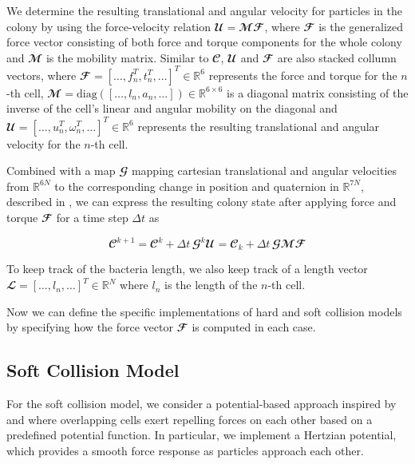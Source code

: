 \documentclass[conference]{IEEEtran}
\begin{document}
We determine the resulting translational and angular velocity for particles in the colony by using the force-velocity relation $\mathbfcal{U} = \mathbfcal{M} \mathbfcal{F}$, where $\mathbfcal{F}$ is the generalized force vector consisting of both force and torque components for the whole colony and $\mathbfcal{M}$ is the mobility matrix. Similar to $\mathbfcal{C}$, $\mathbfcal{U}$ and $\mathbfcal{F}$ are also stacked collumn vectors, where $\mathbfcal{F} = [\dots, f_n^T, t_n^T, \dots]^T \in \mathbb{R}^{6}$ represents the force and torque for the $n$-th cell, $\mathbfcal{M} = \text{diag}([\dots, l_n, a_n, \dots]) \in \mathbb{R}^{6 \times 6}$ is a diagonal matrix consisting of the inverse of the cell's linear and angular mobility on the diagonal and $\mathbfcal{U} = [\dots, u_n^T, \omega_n^T, \dots]^T \in \mathbb{R}^{6}$ represents the resulting translational and angular velocity for the $n$-th cell.

Combined with a map $\mathbfcal{G}$ mapping cartesian translational and angular velocities from $\mathbb{R}^{6N}$ to the corresponding change in position and quaternion in $\mathbb{R}^{7N}$, described in \cite{Weady2024}, we can express the resulting colony state after applying force and torque $\mathbfcal{F}$ for a time step $\Delta t$ as

$$
    \mathbfcal{C}^{k+1}  = \mathbfcal{C}^k + \Delta t \, \mathbfcal{G}^k\mathbfcal{U} = \mathbfcal{C}_k + \Delta t \, \mathbfcal{G}\mathbfcal{M} \mathbfcal{F}
$$
\label{eq:colony_update}


To keep track of the bacteria length, we also keep track of a length vector $\mathbfcal{L} = [\dots, l_n, \dots]^T \in \mathbb{R}^{N}$ where $l_n$ is the length of the $n$-th cell.







Now we can define the specific implementations of hard and soft collision models by specifying how the force vector $\mathbfcal{F}$ is computed in each case.

\newpage

\subsection{Soft Collision Model}

For the soft collision model, we consider a potential-based approach inspired by \cite{Warren2019} and \cite{You2018} where overlapping cells exert repelling forces on each other based on a predefined potential function. In particular, we implement a Hertzian potential, which provides a smooth force response as particles approach each other.
\end{document}
